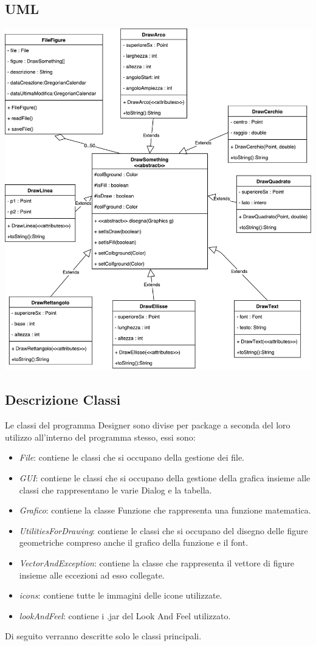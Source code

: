 \documentclass[a4paper,12pt,times,numbered,print,index]{article}
\begin{document}
\subsection{UML}
\begin{center}
	\includegraphics[scale=0.4]{Immagini/UML.pdf}
	\label{UML}
\end{center}


\subsection{Descrizione Classi}
Le classi del programma Designer sono divise per package a seconda del loro utilizzo all'interno del programma stesso, essi sono:
\begin{itemize}
	\item \textit{File}: contiene le classi che si occupano della gestione dei file.
	\item \textit{GUI}: contiene le classi che si occupano della gestione della grafica insieme alle classi che rappresentano le varie Dialog e la tabella.
	\item \textit{Grafico}: contiene la classe Funzione che rappresenta una funzione matematica.
	\item \textit{UtilitiesForDrawing}: contiene le classi che si occupano del disegno delle figure geometriche compreso anche il grafico della funzione e il font.
	\item \textit{VectorAndException}: contiene la classe che rappresenta il vettore di figure insieme alle eccezioni ad esso collegate.
	\item \textit{icons}: contiene tutte le immagini delle icone utilizzate.
	\item \textit{lookAndFeel}: contiene i .jar del Look And Feel utilizzato.
\end{itemize}
Di seguito verranno descritte solo le classi principali.
\end{document}
